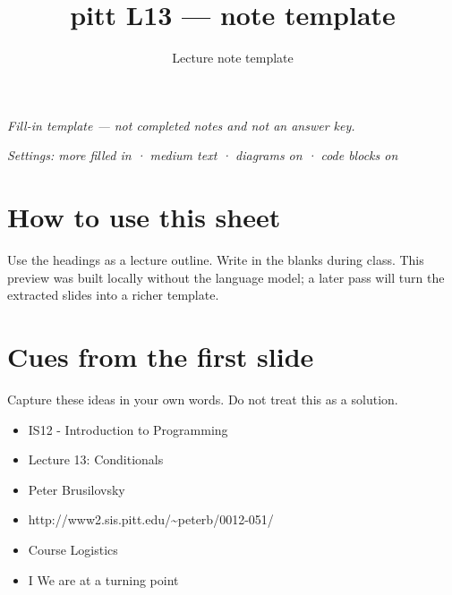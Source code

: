 \documentclass[12pt]{article}
\title{pitt L13 — note template}
\author{Lecture note template}
\date{}
\begin{document}
\maketitle
\begin{center}
\textit{Fill-in template --- not completed notes and not an answer key.}
\end{center}
\noindent\textit{Settings: more filled in · medium text · diagrams on · code blocks on}
\vspace{1em}
\section*{How to use this sheet}
Use the headings as a lecture outline. Write in the blanks during class.
This preview was built locally without the language model; a later pass will
turn the extracted slides into a richer template.
\section*{Cues from the first slide}
Capture these ideas in your own words. Do not treat this as a solution.
\begin{itemize}[leftmargin=*]
  \item IS12 - Introduction to Programming \hrulefill
  \vspace{1.1em}
  \item Lecture 13: Conditionals \hrulefill
  \vspace{1.1em}
  \item Peter Brusilovsky \hrulefill
  \vspace{1.1em}
  \item http://www2.sis.pitt.edu/\textasciitilde{}peterb/0012-051/ \hrulefill
  \vspace{1.1em}
  \item Course Logistics \hrulefill
  \vspace{1.1em}
  \item I We are at a turning point \hrulefill
  \vspace{1.1em}
\end{itemize}
\end{document}
